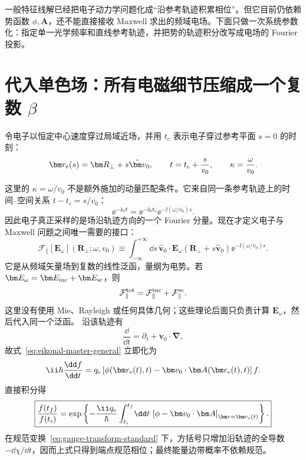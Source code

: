 一般特征线解已经把电子动力学问题化成“沿参考轨迹积累相位”。但它目前仍依赖势函数 $\phi,\bm A$，还不能直接接收 Maxwell 求出的频域电场。下面只做一次系统参数化：指定单一光学频率和直线参考轨迹，并把势的轨迹积分改写成电场的 Fourier 投影。


\section{代入单色场：所有电磁细节压缩成一个复数 $\beta$}

令电子以恒定中心速度穿过局域近场，并用 $t_c$ 表示电子穿过参考平面 $s=0$ 的时刻：
\begin{equation}
\bm r_{\rm e}(s)=\bm R_\perp+s\hat{\bm v}_0,
\qquad
t=t_c+\frac{s}{v_0},
\qquad
\kappa=\frac{\omega}{v_0}.
\label{eq:trajectory-tc}
\end{equation}

这里的 $\kappa=\omega/v_0$ 不是额外施加的动量匹配条件。它来自同一条参考轨迹上的时间--空间关系 $t-t_c=s/v_0$：
\begin{equation}
\ee^{-\ii\omega t}
=\ee^{-\ii\omega t_c}\ee^{-\ii(\omega/v_0)s}.
\label{eq:time-to-space-phase}
\end{equation}
因此电子真正采样的是场沿轨迹方向的一个 Fourier 分量。现在才定义电子与 Maxwell 问题之间唯一需要的接口：
\begin{equation}
\boxed{
\mathcal F_{\parallel}[\bm E_\omega](\bm R_\perp;\omega,v_0)
\equiv
\int_{-\infty}^{+\infty}\!\dd s\,
\hat{\bm v}_0\cdot\bm E_\omega(\bm R_\perp+s\hat{\bm v}_0)
\ee^{-\ii(\omega/v_0)s}.}
\label{eq:Fparallel-general-def}
\end{equation}
它是从频域矢量场到复数的线性泛函，量纲为电势。若
$\bm E_\omega=\bm E_{\rm inc}+\bm E_{\rm sc}$，则
\begin{equation}
\mathcal F_{\parallel}^{\rm tot}
=\mathcal F_{\parallel}^{\rm inc}
+\mathcal F_{\parallel}^{\rm sc}.
\label{eq:F-total-decomposition}
\end{equation}
这里没有使用 Mie、Rayleigh 或任何具体几何；这些理论后面只负责计算 $\bm E_\omega$，然后代入同一个泛函。
沿该轨迹有
\begin{equation}
\frac{\dd}{\dd t}
=\partial_t+\bm v_0\cdot\bm\nabla,
\end{equation}
故式~\eqref{eq:eikonal-master-general} 立即化为
\begin{equation}
\ii\hbar\frac{\dd f}{\dd t}
=q_{\rm e}\left[\phi(\bm r_{\rm e}(t),t)-\bm v_0\cdot\bm A(\bm r_{\rm e}(t),t)\right]f.
\end{equation}
直接积分得
\begin{equation}
\boxed{
\frac{f(t_f)}{f(t_i)}
=\exp\left\{-\frac{\ii q_{\rm e}}{\hbar}
\int_{t_i}^{t_f}\!\dd t\,
\left[\phi-\bm v_0\cdot\bm A\right]_{\bm r=\bm r_{\rm e}(t)}\right\}.}
\label{eq:eikonal-phase-general}
\end{equation}
在规范变换~\eqref{eq:gauge-transform-standard} 下，方括号只增加沿轨迹的全导数 $-\dd\chi/\dd t$，因而上式只得到端点规范相位；最终能量边带概率不依赖规范。


